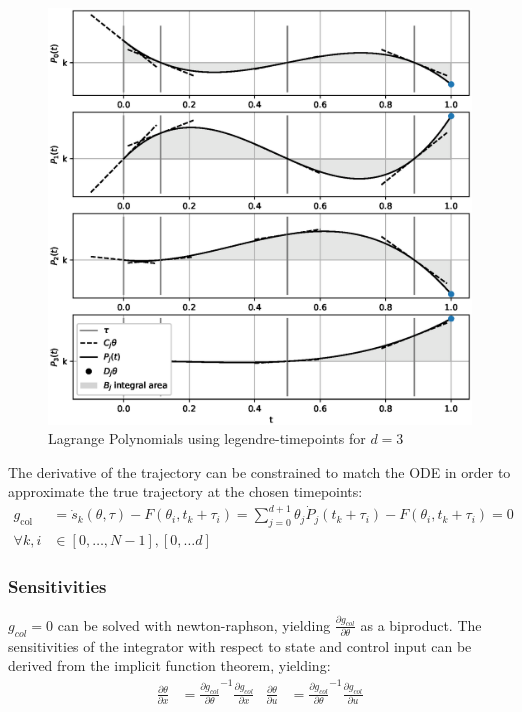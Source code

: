 \begin{figure}[h]
    \centering
    \includegraphics[width=1\textwidth]{Figures/lagrange_polynomial.eps}
    \caption{Lagrange Polynomials using legendre-timepoints for $d=3$}
    \label{fig:Lagrange_Polynomials}
\end{figure}

The derivative of the trajectory can be constrained to match the ODE in order to approximate the true trajectory at the chosen timepoints:
\begin{align}
    g_{\text{col}} &= \dot{s}_k(\theta, \tau) - F(\theta_i, t_k + \tau_i) = \sum_{j=0}^{d+1}\theta_j\dot{P}_j(t_k + \tau_i)  - F(\theta_i, t_k + \tau_i) = 0\\ \forall k, i &\in [0,\dots, N-1], [0, \dots d]\nonumber
\end{align}
\subsubsection{Sensitivities}
$g_{col} = 0$ can be solved with newton-raphson, yielding $\frac{\partial g_{col}}{\partial \theta}$ as a biproduct. The sensitivities of the integrator with respect to state and control input can be derived from the implicit function theorem, yielding:
\begin{align}
    \frac{\partial \theta}{\partial x} &= \frac{\partial g_{col}}{\partial \theta}^{-1}\frac{\partial g_{col}}{\partial x} &     \frac{\partial \theta}{\partial u} &= \frac{\partial g_{col}}{\partial \theta}^{-1}\frac{\partial g_{col}}{\partial u}
\end{align}



